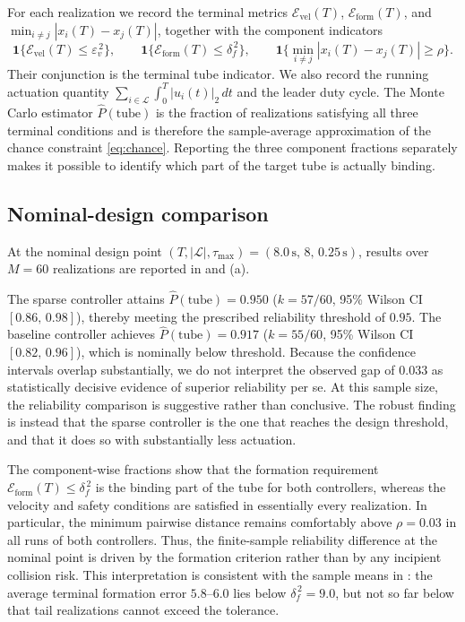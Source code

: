 \documentclass[pdflatex,sn-mathphys-num]{sn-jnl}%
\numberwithin{equation}{section}
\theoremstyle{thmstyleone}%
\theoremstyle{remark}
\theoremstyle{definition}
\newcommand{\calL}{\mathcal{L}}
\newcommand{\calE}{\mathcal{E}}
\begin{document}
For each realization we record the terminal metrics
$\calE_{\mathrm{vel}}(T)$, $\calE_{\mathrm{form}}(T)$, and
$\min_{i\neq j}|x_i(T)-x_j(T)|$, together with the component indicators
\[
  \mathbf{1}\{\calE_{\mathrm{vel}}(T)\le \varepsilon_v^{\,2}\},\qquad
  \mathbf{1}\{\calE_{\mathrm{form}}(T)\le \delta_f^{\,2}\},\qquad
  \mathbf{1}\{\min_{i\neq j}|x_i(T)-x_j(T)|\ge \rho\}.
\]
Their conjunction is the terminal tube indicator. We also record the
running actuation quantity
$\sum_{i\in\calL}\int_0^T |u_i(t)|_2\,dt$ and the leader duty cycle. The
Monte Carlo estimator $\hat P(\mathrm{tube})$ is the fraction of
realizations satisfying all three terminal conditions and is therefore the
sample-average approximation of the chance constraint \eqref{eq:chance}.
Reporting the three component fractions separately makes it possible to
identify which part of the target tube is actually binding.

\subsection{Nominal-design comparison}
\label{subsec:num-nominal}

At the nominal design point
$(T,|\calL|,\tau_{\max})=(8.0\,\mathrm{s},\,8,\,0.25\,\mathrm{s})$,
results over $M=60$ realizations are reported in
 and (a).

The sparse controller attains
$\hat P(\mathrm{tube})=0.950$ ($k=57/60$, 95\% Wilson CI $[0.86,\,0.98]$),
thereby meeting the prescribed reliability threshold of $0.95$. The
baseline controller achieves
$\hat P(\mathrm{tube})=0.917$ ($k=55/60$, 95\% Wilson CI $[0.82,\,0.96]$),
which is nominally below threshold. Because the confidence intervals overlap
substantially, we do not interpret the observed gap of $0.033$ as
statistically decisive evidence of superior reliability per se. At
this sample size, the reliability comparison is suggestive rather than
conclusive. The robust finding is instead that the sparse controller is the
one that reaches the design threshold, and that it does so with
substantially less actuation.

The component-wise fractions show that the formation requirement
$\calE_{\mathrm{form}}(T)\le \delta_f^{\,2}$ is the binding part of the tube
for both controllers, whereas the velocity and safety conditions are
satisfied in essentially every realization. In particular, the minimum
pairwise distance remains comfortably above $\rho=0.03$ in all runs of both
controllers. Thus, the finite-sample reliability difference at the nominal
point is driven by the formation criterion rather than by any incipient
collision risk. This interpretation is consistent with the sample means in
: the average terminal formation error
$5.8$--$6.0$ lies below $\delta_f^{\,2}=9.0$, but not so far below that
tail realizations cannot exceed the tolerance.
\end{document}
